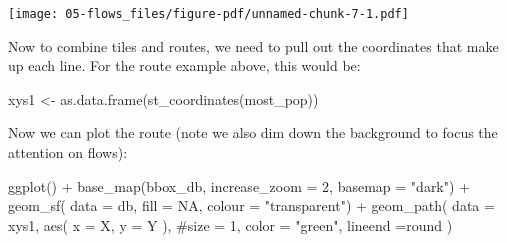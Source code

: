 \documentclass[
  letterpaper,
  DIV=11,
  numbers=noendperiod,
  oneside]{scrreprt}
\newenvironment{Shaded}{\begin{snugshade}}{\end{snugshade}}
\newcommand{\AttributeTok}[1]{\textcolor[rgb]{0.40,0.45,0.13}{#1}}
\newcommand{\CommentTok}[1]{\textcolor[rgb]{0.37,0.37,0.37}{#1}}
\newcommand{\ConstantTok}[1]{\textcolor[rgb]{0.56,0.35,0.01}{#1}}
\newcommand{\DecValTok}[1]{\textcolor[rgb]{0.68,0.00,0.00}{#1}}
\newcommand{\FunctionTok}[1]{\textcolor[rgb]{0.28,0.35,0.67}{#1}}
\newcommand{\NormalTok}[1]{\textcolor[rgb]{0.00,0.23,0.31}{#1}}
\newcommand{\OtherTok}[1]{\textcolor[rgb]{0.00,0.23,0.31}{#1}}
\newcommand{\SpecialCharTok}[1]{\textcolor[rgb]{0.37,0.37,0.37}{#1}}
\newcommand{\StringTok}[1]{\textcolor[rgb]{0.13,0.47,0.30}{#1}}
\begin{document}
\texttt{[image: 05-flows\_files/figure-pdf/unnamed-chunk-7-1.pdf]}

Now to combine tiles and routes, we need to pull out the coordinates
that make up each line. For the route example above, this would be:

\begin{Shaded}
\begin{Highlighting}[]
\NormalTok{xys1 }\OtherTok{\textless{}{-}} \FunctionTok{as.data.frame}\NormalTok{(}\FunctionTok{st\_coordinates}\NormalTok{(most\_pop))}
\end{Highlighting}
\end{Shaded}

Now we can plot the route (note we also dim down the background to focus
the attention on flows):


\begin{Shaded}
\begin{Highlighting}[]
\FunctionTok{ggplot}\NormalTok{() }\SpecialCharTok{+}
  \FunctionTok{base\_map}\NormalTok{(bbox\_db, }\AttributeTok{increase\_zoom =} \DecValTok{2}\NormalTok{, }\AttributeTok{basemap =} \StringTok{"dark"}\NormalTok{) }\SpecialCharTok{+}
    \FunctionTok{geom\_sf}\NormalTok{( }\AttributeTok{data =}\NormalTok{ db, }\AttributeTok{fill =} \ConstantTok{NA}\NormalTok{, }\AttributeTok{colour =} \StringTok{"transparent"}\NormalTok{) }\SpecialCharTok{+}
  \FunctionTok{geom\_path}\NormalTok{( }\AttributeTok{data =}\NormalTok{ xys1, }
             \FunctionTok{aes}\NormalTok{( }\AttributeTok{x =}\NormalTok{ X, }\AttributeTok{y =}\NormalTok{ Y ), }
             \CommentTok{\#size = 1,}
             \AttributeTok{color =} \StringTok{"green"}\NormalTok{,}
             \AttributeTok{lineend =}\StringTok{\textquotesingle{}round\textquotesingle{}}
\NormalTok{             )}
\end{Highlighting}
\end{Shaded}
\end{document}
